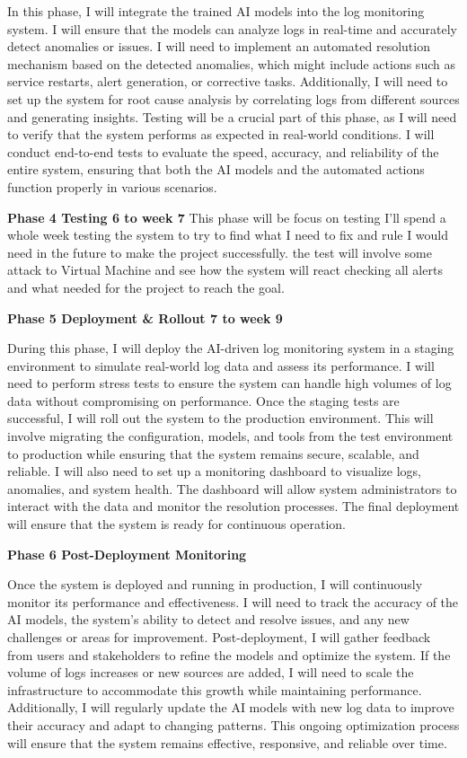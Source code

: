 In this phase, I will integrate the trained AI models into the log monitoring system. I will ensure that the models can analyze logs in real-time and accurately detect anomalies or issues. I will need to implement an automated resolution mechanism based on the detected anomalies, which might include actions such as service restarts, alert generation, or corrective tasks. Additionally, I will need to set up the system for root cause analysis by correlating logs from different sources and generating insights. Testing will be a crucial part of this phase, as I will need to verify that the system performs as expected in real-world conditions. I will conduct end-to-end tests to evaluate the speed, accuracy, and reliability of the entire system, ensuring that both the AI models and the automated actions function properly in various scenarios.

\textbf{Phase 4 Testing 6 to week 7}
This phase will be focus on testing I'll spend a whole week testing the system to try to find what I need to fix and rule I would need in the future to make the project successfully. the test will involve some attack to Virtual Machine and see how the system will react checking all alerts and what needed for the project to reach the goal.

\textbf{Phase 5 Deployment \& Rollout 7 to week  9}

During this phase, I will deploy the AI-driven log monitoring system in a staging environment to simulate real-world log data and assess its performance. I will need to perform stress tests to ensure the system can handle high volumes of log data without compromising on performance. Once the staging tests are successful, I will roll out the system to the production environment. This will involve migrating the configuration, models, and tools from the test environment to production while ensuring that the system remains secure, scalable, and reliable. I will also need to set up a monitoring dashboard to visualize logs, anomalies, and system health. The dashboard will allow system administrators to interact with the data and monitor the resolution processes. The final deployment will ensure that the system is ready for continuous operation.


\textbf{Phase 6 Post-Deployment Monitoring}


Once the system is deployed and running in production, I will continuously monitor its performance and effectiveness. I will need to track the accuracy of the AI models, the system’s ability to detect and resolve issues, and any new challenges or areas for improvement. Post-deployment, I will gather feedback from users and stakeholders to refine the models and optimize the system. If the volume of logs increases or new sources are added, I will need to scale the infrastructure to accommodate this growth while maintaining performance. Additionally, I will regularly update the AI models with new log data to improve their accuracy and adapt to changing patterns. This ongoing optimization process will ensure that the system remains effective, responsive, and reliable over time.

